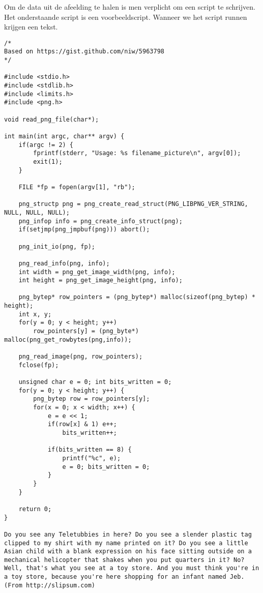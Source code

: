 Om de data uit de afeelding te halen is men verplicht om een script te schrijven. Het onderstaande script is een voorbeeldscript. Wanneer we het script runnen krijgen een tekst.
\begin{lstlisting}
/*
Based on https://gist.github.com/niw/5963798
*/

#include <stdio.h>
#include <stdlib.h>
#include <limits.h>
#include <png.h>

void read_png_file(char*);

int main(int argc, char** argv) {
	if(argc != 2) {
		fprintf(stderr, "Usage: %s filename_picture\n", argv[0]);
		exit(1);
	}

	FILE *fp = fopen(argv[1], "rb");	

	png_structp png = png_create_read_struct(PNG_LIBPNG_VER_STRING, NULL, NULL, NULL);
	png_infop info = png_create_info_struct(png);
	if(setjmp(png_jmpbuf(png))) abort();

	png_init_io(png, fp);

	png_read_info(png, info);
	int width = png_get_image_width(png, info);
	int height = png_get_image_height(png, info);

	png_bytep* row_pointers = (png_bytep*) malloc(sizeof(png_bytep) * height);
	int x, y;
	for(y = 0; y < height; y++)
		row_pointers[y] = (png_byte*) malloc(png_get_rowbytes(png,info));

	png_read_image(png, row_pointers);
	fclose(fp);

	unsigned char e = 0; int bits_written = 0;
	for(y = 0; y < height; y++) {
		png_bytep row = row_pointers[y];
		for(x = 0; x < width; x++) {
			e = e << 1;
			if(row[x] & 1) e++;
				bits_written++;

			if(bits_written == 8) {
				printf("%c", e);
				e = 0; bits_written = 0;
			}
		}
	}

	return 0;
}

Do you see any Teletubbies in here? Do you see a slender plastic tag clipped to my shirt with my name printed on it? Do you see a little Asian child with a blank expression on his face sitting outside on a mechanical helicopter that shakes when you put quarters in it? No? Well, that's what you see at a toy store. And you must think you're in a toy store, because you're here shopping for an infant named Jeb. (From http://slipsum.com)
\end{lstlisting}